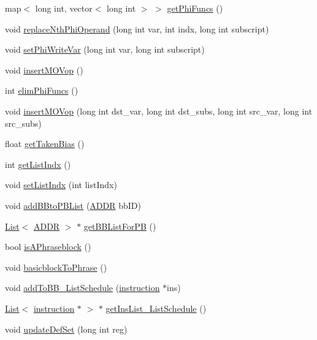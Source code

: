 \begin{DoxyCompactItemize}
\item 
map$<$ long int, vector$<$ long int $>$ $>$ \hyperlink{classbasicblock_a3b5148a1563478d689e1e3796ebd7dba}{getPhiFuncs} ()
\item 
void \hyperlink{classbasicblock_a129efbec925894799b11962ee9ec8b72}{replaceNthPhiOperand} (long int var, int indx, long int subscript)
\item 
void \hyperlink{classbasicblock_a8b4180d38d685e0def92a4512ab4f1ce}{setPhiWriteVar} (long int var, long int subscript)
\item 
void \hyperlink{classbasicblock_a86973a86f54f7d42ee2e3871a0ff47e1}{insertMOVop} ()
\item 
int \hyperlink{classbasicblock_a27c168ce65c2d5ead06682ea41af8473}{elimPhiFuncs} ()
\item 
void \hyperlink{classbasicblock_a85e079721ac3397044a6148e4d5fc688}{insertMOVop} (long int dst\_\-var, long int dst\_\-subs, long int src\_\-var, long int src\_\-subs)
\item 
float \hyperlink{classbasicblock_afdffc2f38dc3e93c9125a1e4d205f4e9}{getTakenBias} ()
\item 
int \hyperlink{classbasicblock_a17c48156a5eefea6d8ca831dced719e3}{getListIndx} ()
\item 
void \hyperlink{classbasicblock_a1d85d5fd059f1658ce3c67357502ed71}{setListIndx} (int listIndx)
\item 
void \hyperlink{classbasicblock_ab20f99e31cfc155ec00b9027f9c3d454}{addBBtoPBList} (\hyperlink{binaryTranslator_2global_8h_aa4557b0650cb21e57e3e4623410832c6}{ADDR} bbID)
\item 
\hyperlink{classList}{List}$<$ \hyperlink{binaryTranslator_2global_8h_aa4557b0650cb21e57e3e4623410832c6}{ADDR} $>$ $\ast$ \hyperlink{classbasicblock_a4a68932d0628e028f4c5877cb888654c}{getBBListForPB} ()
\item 
bool \hyperlink{classbasicblock_a88276960d345d6849dbe02c9debbb94e}{isAPhraseblock} ()
\item 
void \hyperlink{classbasicblock_af48f1b1d1c2618185cf63aa36098092c}{basicblockToPhrase} ()
\item 
void \hyperlink{classbasicblock_abb72488dac0d405735a4cf82a1cdd0ce}{addToBB\_\-ListSchedule} (\hyperlink{classinstruction}{instruction} $\ast$ins)
\item 
\hyperlink{classList}{List}$<$ \hyperlink{classinstruction}{instruction} $\ast$ $>$ $\ast$ \hyperlink{classbasicblock_a87440b1ddb945365a4d32b356756ae24}{getInsList\_\-ListSchedule} ()
\item 
void \hyperlink{classbasicblock_aa30a3590075a3c30fa5406e3cf81a2e1}{updateDefSet} (long int reg)

\end{DoxyCompactItemize}
